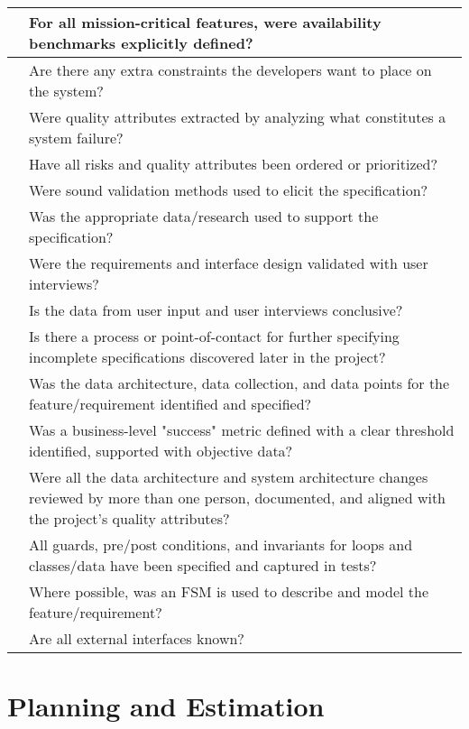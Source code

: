 \documentclass{article}
\begin{document}
\begin{center}
\begin{tabular}{ | p{.25cm} || p{10cm} |}
     & For all mission-critical features, were availability benchmarks explicitly defined? \\ \hline
     & Are there any extra constraints the developers want to place on the system? \\ \hline
     & Were quality attributes extracted by analyzing what constitutes a system failure? \\ \hline
     & Have all risks and quality attributes been ordered or prioritized? \\ \hline
     & Were sound validation methods used to elicit the specification? \\ \hline
     & Was the appropriate data/research used to support the specification? \\ \hline
     & Were the requirements and interface design validated with user interviews? \\ \hline
     & Is the data from user input and user interviews conclusive? \\ \hline
     & Is there a process or point-of-contact for further specifying incomplete specifications discovered later in the project? \\ \hline
     & Was the data architecture, data collection, and data points for the feature/requirement identified and specified? \\ \hline
     & Was a business-level "success" metric defined with a clear threshold identified, supported with objective data? \\ \hline
     & Were all the data architecture and system architecture changes reviewed by more than one person, documented, and aligned with the project's quality attributes? \\ \hline
     & All guards, pre/post conditions, and invariants for loops and classes/data have been specified and captured in tests? \\ \hline
     & Where possible, was an FSM is used to describe and model the feature/requirement? \\ \hline
     & Are all external interfaces known? \\ \hline
    \end{tabular}
\end{center}



\section{Planning and Estimation}
\end{document}
